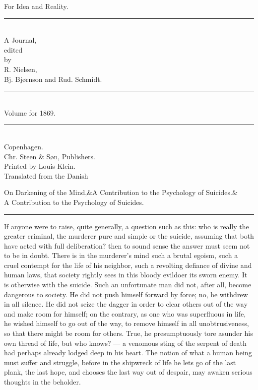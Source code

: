 \documentclass[12pt,a4paper,openany]{book}
\newcommand{\opage}[1]{\marginnote{\footnotesize\textit{[#1]}}}
\newcommand{\essayhead}[2]{\begin{center}{\large #1}\ifx&#2&\else\\[0.3em]{\normalsize #2}\fi\\[0.5em]\rule{3em}{0.4pt}\end{center}\medskip\noindent}
\begin{document}
\begin{titlepage}
\begin{center}
\vspace*{3em}
{\Huge For Idea and Reality.}\\[1em]
\rule{8em}{0.4pt}\\[1em]
{\large A Journal,}\\[0.8em]
{\small edited}\\[0.4em]
{\footnotesize by}\\[0.6em]
{\large R. Nielsen,}\\[0.4em]
{\large Bj. Bjørnson and Rud. Schmidt.}\\[1em]
\rule{8em}{0.4pt}\\[1em]
{\large Volume for 1869.}\\[1em]
\rule{8em}{0.4pt}\\[4em]
Copenhagen.\\[0.4em]
Chr. Steen \& Søn, Publishers.\\[1.5em]
{\small Printed by Louis Klein.}\\[3em]
{\small Translated from the Danish}
\end{center}
\end{titlepage}

\essayhead{On Darkening of the Mind,}{A Contribution to the Psychology of Suicides.}
\setcounter{footnote}{0}%
\opage{689}If anyone were to raise, quite generally, a question such as this: who is really the greater criminal, the murderer pure and simple or the suicide, assuming that both have acted with full deliberation? then to sound sense the answer must seem not to be in doubt. There is in the murderer's mind such a brutal egoism, such a cruel contempt for the life of his neighbor, such a revolting defiance of divine and human laws, that society rightly sees in this bloody evildoer its sworn enemy. It is otherwise with the suicide. Such an unfortunate man did not, after all, become dangerous to society. He did not push himself forward by force; no, he withdrew in all silence. He did not seize the dagger in order to clear others out of the way and make room for himself; on the contrary, as one who was superfluous in life, he wished himself to go out of the way, to remove himself in all unobtrusiveness, so that there might be room for others. True, he presumptuously tore asunder his own thread of life, but who knows? --- a venomous sting of the serpent of death had perhaps already lodged deep in his heart. The notion of what a human being must suffer and struggle, before in the shipwreck of life he lets go of the last plank, the last hope, and chooses the last way out of despair, may awaken serious thoughts in the beholder.
\end{document}
